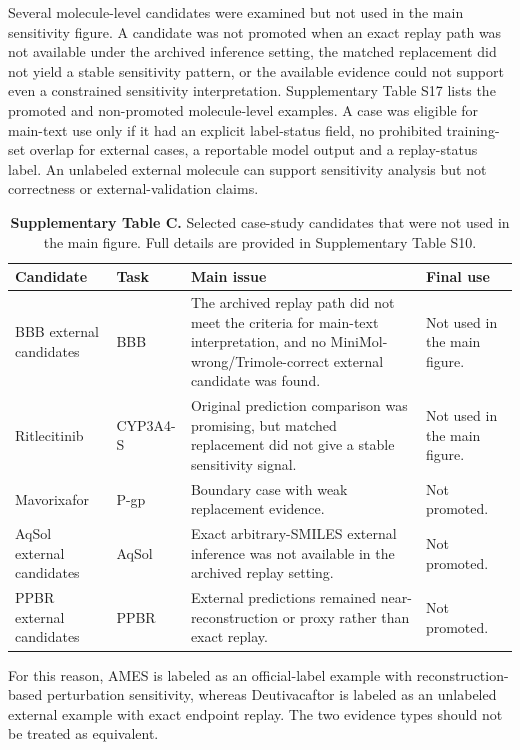 \documentclass[10pt]{article}
\begin{document}
Several molecule-level candidates were examined but not used in the main sensitivity figure. A candidate was not promoted when an exact replay path was not available under the archived inference setting, the matched replacement did not yield a stable sensitivity pattern, or the available evidence could not support even a constrained sensitivity interpretation. Supplementary Table S17 lists the promoted and non-promoted molecule-level examples. A case was eligible for main-text use only if it had an explicit label-status field, no prohibited training-set overlap for external cases, a reportable model output and a replay-status label. An unlabeled external molecule can support sensitivity analysis but not correctness or external-validation claims.

\begin{table}[htbp]
\centering
\caption*{\textbf{Supplementary Table C.} Selected case-study candidates that were not used in the main figure. Full details are provided in Supplementary Table S10.}
\small
\renewcommand{\arraystretch}{1.12}
\begin{tabularx}{\textwidth}{p{2.6cm} p{1.8cm} Y Y}
\toprule
{}
Candidate & Task & Main issue & Final use \\
\midrule
BBB external candidates & BBB & The archived replay path did not meet the criteria for main-text interpretation, and no MiniMol-wrong/Trimole-correct external candidate was found. & Not used in the main figure. \\
Ritlecitinib & CYP3A4-S & Original prediction comparison was promising, but matched replacement did not give a stable sensitivity signal. & Not used in the main figure. \\
Mavorixafor & P-gp & Boundary case with weak replacement evidence. & Not promoted. \\
AqSol external candidates & AqSol & Exact arbitrary-SMILES external inference was not available in the archived replay setting. & Not promoted. \\
PPBR external candidates & PPBR & External predictions remained near-reconstruction or proxy rather than exact replay. & Not promoted. \\
\bottomrule
\end{tabularx}
\end{table}

For this reason, AMES is labeled as an official-label example with reconstruction-based perturbation sensitivity, whereas Deutivacaftor is labeled as an unlabeled external example with exact endpoint replay. The two evidence types should not be treated as equivalent.
\end{document}
